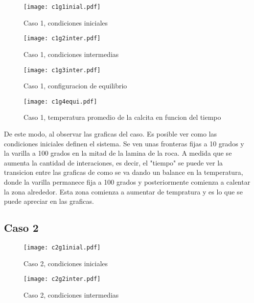 \documentclass[reprint,amsmath,amssymb]{revtex4-1}
\begin{document}
\begin{figure}[h!]
    \centering
    \texttt{[image: c1g1inial.pdf]}
    \caption{Caso 1, condiciones iniciales}
\end{figure}

\begin{figure}[h!]
    \centering
    \texttt{[image: c1g2inter.pdf]}
    \caption{Caso 1, condiciones intermedias}
\end{figure}

\begin{figure}[h!]
    \centering
    \texttt{[image: c1g3inter.pdf]}
    \caption{Caso 1, configuracion de equilibrio}
\end{figure}

\begin{figure}[h!]
    \centering
    \texttt{[image: c1g4equi.pdf]}
    \caption{Caso 1, temperatura promedio de la calcita en funcion del tiempo}
\end{figure}

De este modo, al observar las graficas del caso. Es posible ver como las condiciones iniciales definen el sistema. Se ven unas fronteras fijas a 10 grados y la varilla a 100 grados en la mitad de la lamina de la roca. A medida que se aumenta la cantidad de interaciones, es decir, el "tiempo" se puede ver la transicion entre las graficas de como se va dando un balance en la temperatura, donde la varilla permanece fija a 100 grados y posteriormente comienza a calentar la zona alrededor. Esta zona comienza a aumentar de tempratura y es lo que se puede apreciar en las graficas.

\subsection{Caso 2}

\begin{figure}[h!]
    \centering
    \texttt{[image: c2g1inial.pdf]}
    \caption{Caso 2, condiciones iniciales}
\end{figure}

\begin{figure}[h!]
    \centering
    \texttt{[image: c2g2inter.pdf]}
    \caption{Caso 2, condiciones intermedias}
\end{figure}
\end{document}
